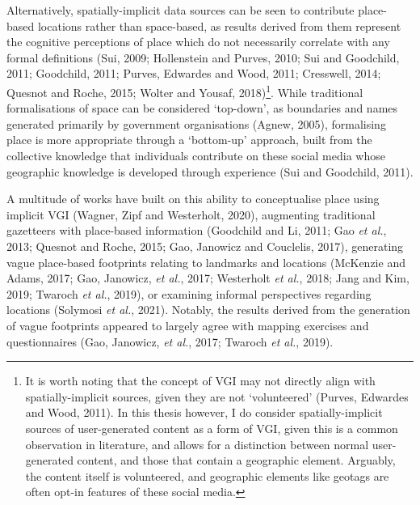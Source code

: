 \documentclass[
  letterpaper,
  11pt,
  english,
  onehalfspacing,
  headsepline]{MastersDoctoralThesis}
\begin{document}
Alternatively, spatially-implicit data sources can be seen to contribute
place-based locations rather than space-based, as results derived from
them represent the cognitive perceptions of place which do not
necessarily correlate with any formal definitions (Sui, 2009;
Hollenstein and Purves, 2010; Sui and Goodchild, 2011; Goodchild, 2011;
Purves, Edwardes and Wood, 2011; Cresswell, 2014; Quesnot and Roche,
2015; Wolter and Yousaf, 2018)\footnote{It is worth noting that the
  concept of VGI may not directly align with spatially-implicit sources,
  given they are not `volunteered' (Purves, Edwardes and Wood, 2011). In
  this thesis however, I do consider spatially-implicit sources of
  user-generated content as a form of VGI, given this is a common
  observation in literature, and allows for a distinction between normal
  user-generated content, and those that contain a geographic element.
  Arguably, the content itself is volunteered, and geographic elements
  like geotags are often opt-in features of these social media.}. While
traditional formalisations of space can be considered `top-down', as
boundaries and names generated primarily by government organisations
(Agnew, 2005), formalising place is more appropriate through a
`bottom-up' approach, built from the collective knowledge that
individuals contribute on these social media whose geographic knowledge
is developed through experience (Sui and Goodchild, 2011).

A multitude of works have built on this ability to conceptualise place
using implicit VGI (Wagner, Zipf and Westerholt, 2020), augmenting
traditional gazetteers with place-based information (Goodchild and Li,
2011; Gao \emph{et al.}, 2013; Quesnot and Roche, 2015; Gao, Janowicz
and Couclelis, 2017), generating vague place-based footprints relating
to landmarks and locations (McKenzie and Adams, 2017; Gao, Janowicz,
\emph{et al.}, 2017; Westerholt \emph{et al.}, 2018; Jang and Kim, 2019;
Twaroch \emph{et al.}, 2019), or examining informal perspectives
regarding locations (Solymosi \emph{et al.}, 2021). Notably, the results
derived from the generation of vague footprints appeared to largely
agree with mapping exercises and questionnaires (Gao, Janowicz, \emph{et
al.}, 2017; Twaroch \emph{et al.}, 2019).
\end{document}
